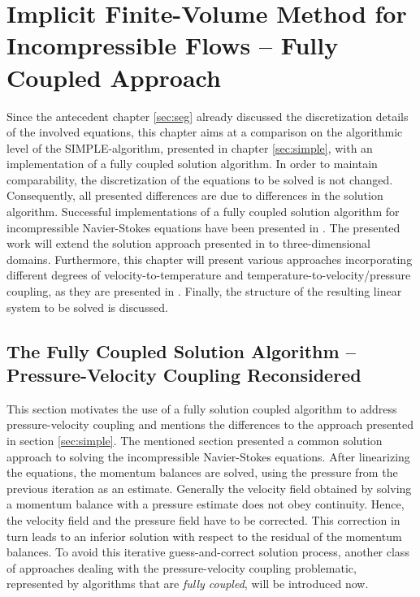 \chapter{Implicit Finite-Volume Method for Incompressible Flows -- Fully Coupled Approach}
\label{sec:cpld}

Since the antecedent chapter \ref{sec:seg} already discussed the discretization details of the involved equations, this chapter aims at a comparison on the algorithmic level of the SIMPLE-algorithm, presented in chapter \ref{sec:simple}, with an implementation of a fully coupled solution algorithm. In order to maintain comparability, the discretization of the equations to be solved is not changed. Consequently, all presented differences are due to differences in the solution algorithm. Successful implementations of a fully coupled solution algorithm for incompressible Navier-Stokes equations have been presented in \cite{chen10,darwish09,falk13,vakilipour12}. The presented work will extend the solution approach presented in \cite{falk13} to three-dimensional domains. Furthermore, this chapter will present various approaches incorporating different degrees of velocity-to-temperature and temperature-to-velocity/pressure coupling, as they are presented in \cite{galpin86,vakilipour12}. Finally, the structure of the resulting linear system to be solved is discussed.

\section{The Fully Coupled Solution Algorithm -- Pressure-Velocity Coupling Reconsidered}
\label{sec:reconsider}

This section motivates the use of a fully solution coupled algorithm to address pressure-velocity coupling and mentions the differences to the approach presented in section \ref{sec:simple}. The mentioned section presented a common solution approach to solving the incompressible Navier-Stokes equations. After linearizing the equations, the momentum balances are solved, using the pressure from the previous iteration as an estimate. Generally the velocity field obtained by solving a momentum balance with a pressure estimate does not obey continuity. Hence, the velocity field and the pressure field have to be corrected. This correction in turn leads to an inferior solution with respect to the residual of the momentum balances. To avoid this iterative guess-and-correct solution process, another class of approaches dealing with the pressure-velocity coupling problematic, represented by algorithms that are \emph{fully coupled}, will be introduced now.


